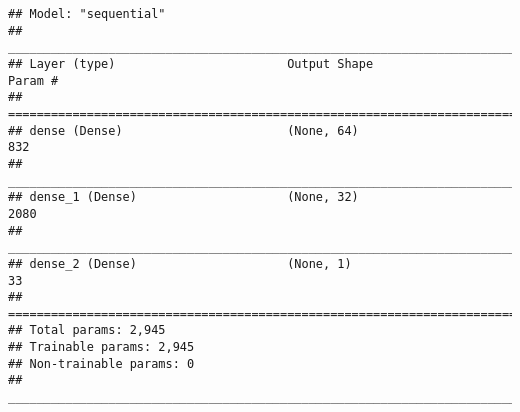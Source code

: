 \documentclass[
]{article}
\newenvironment{Shaded}{\begin{snugshade}}{\end{snugshade}}
\newcommand{\ControlFlowTok}[1]{\textcolor[rgb]{0.13,0.29,0.53}{\textbf{#1}}}
\newcommand{\DataTypeTok}[1]{\textcolor[rgb]{0.13,0.29,0.53}{#1}}
\newcommand{\DecValTok}[1]{\textcolor[rgb]{0.00,0.00,0.81}{#1}}
\newcommand{\KeywordTok}[1]{\textcolor[rgb]{0.13,0.29,0.53}{\textbf{#1}}}
\newcommand{\NormalTok}[1]{#1}
\newcommand{\OperatorTok}[1]{\textcolor[rgb]{0.81,0.36,0.00}{\textbf{#1}}}
\newcommand{\StringTok}[1]{\textcolor[rgb]{0.31,0.60,0.02}{#1}}
\begin{document}
\begin{Shaded}
\end{Shaded}

\begin{verbatim}
## Model: "sequential"
## ________________________________________________________________________________
## Layer (type)                        Output Shape                    Param #     
## ================================================================================
## dense (Dense)                       (None, 64)                      832         
## ________________________________________________________________________________
## dense_1 (Dense)                     (None, 32)                      2080        
## ________________________________________________________________________________
## dense_2 (Dense)                     (None, 1)                       33          
## ================================================================================
## Total params: 2,945
## Trainable params: 2,945
## Non-trainable params: 0
## ________________________________________________________________________________
\end{verbatim}
\end{document}
